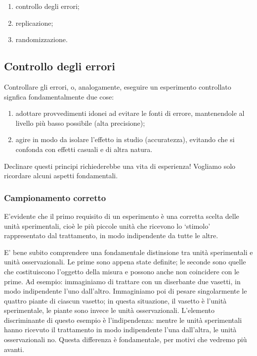 \documentclass[a4paper,12pt,oneside]{book}
\providecommand{\tightlist}{%
  \setlength{\itemsep}{0pt}\setlength{\parskip}{0pt}}
\begin{document}
\begin{enumerate}
\def\labelenumi{\arabic{enumi}.}
\tightlist
\item
  controllo degli errori;
\item
  replicazione;
\item
  randomizzazione.
\end{enumerate}

\subsection{Controllo degli errori}\label{controllo-degli-errori}

Controllare gli errori, o, analogamente, eseguire un esperimento
controllato signfica fondamentalmente due cose:

\begin{enumerate}
\def\labelenumi{\arabic{enumi}.}
\tightlist
\item
  adottare provvedimenti idonei ad evitare le fonti di errore,
  mantenendole al livello più basso possibile (alta precisione);
\item
  agire in modo da isolare l'effetto in studio (accuratezza), evitando
  che si confonda con effetti casuali e di altra natura.
\end{enumerate}

Declinare questi principi richiederebbe una vita di esperienza! Vogliamo
solo ricordare alcuni aspetti fondamentali.

\subsubsection{Campionamento corretto}\label{campionamento-corretto}

E'evidente che il primo requisito di un esperimento è una corretta
scelta delle unità sperimentali, cioè le più piccole unità che ricevono
lo `stimolo' rappresentato dal trattamento, in modo indipendente da
tutte le altre.

E' bene subito comprendere una fondamentale distinsione tra unità
sperimentali e unità osservazionali. Le prime sono appena state
definite; le seconde sono quelle che costituiscono l'oggetto della
misura e possono anche non coincidere con le prime. Ad esempio:
immaginiamo di trattare con un diserbante due vasetti, in modo
indipendente l'uno dall'altro. Immaginiamo poi di pesare singolarmente
le quattro piante di ciascun vasetto; in questa situazione, il vasetto è
l'unità sperimentale, le piante sono invece le unità osservazionali.
L'elemento discriminante di questo esempio è l'indipendenza: mentre le
unità sperimentali hanno ricevuto il trattamento in modo indipendente
l'una dall'altra, le unità osservazionali no. Questa differenza è
fondamentale, per motivi che vedremo più avanti.
\end{document}
